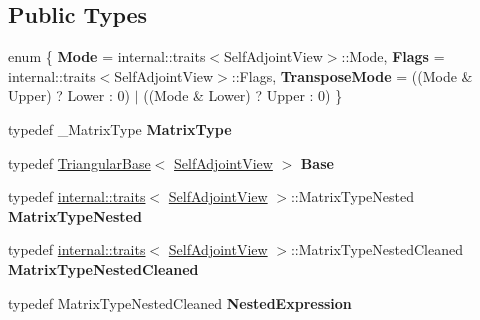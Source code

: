 \subsection*{Public Types}
\begin{DoxyCompactItemize}
\item 
\mbox{\label{class_eigen_1_1_self_adjoint_view_aa62be3bd8c8e4b595691923e883ea725}} 
enum \{ {\bfseries Mode} = internal\+::traits$<$Self\+Adjoint\+View$>$\+::Mode, 
{\bfseries Flags} = internal\+::traits$<$Self\+Adjoint\+View$>$\+::Flags, 
{\bfseries Transpose\+Mode} = ((Mode \& Upper) ? Lower \+: 0) $\vert$ ((Mode \& Lower) ? Upper \+: 0)
 \}
\item 
\mbox{\label{class_eigen_1_1_self_adjoint_view_a9ec5b4c046771bcfbfdf751f3356095b}} 
typedef \+\_\+\+Matrix\+Type {\bfseries Matrix\+Type}
\item 
\mbox{\label{class_eigen_1_1_self_adjoint_view_a2c091fa183af81f0d5d45082ad724dfd}} 
typedef \mbox{\hyperlink{class_eigen_1_1_triangular_base}{Triangular\+Base}}$<$ \mbox{\hyperlink{class_eigen_1_1_self_adjoint_view}{Self\+Adjoint\+View}} $>$ {\bfseries Base}
\item 
\mbox{\label{class_eigen_1_1_self_adjoint_view_a80c089aea071ac21f4e4a1347cd18b6d}} 
typedef \mbox{\hyperlink{struct_eigen_1_1internal_1_1traits}{internal\+::traits}}$<$ \mbox{\hyperlink{class_eigen_1_1_self_adjoint_view}{Self\+Adjoint\+View}} $>$\+::Matrix\+Type\+Nested {\bfseries Matrix\+Type\+Nested}
\item 
\mbox{\label{class_eigen_1_1_self_adjoint_view_a4bf6749960d2e447b4117b4c81f16fff}} 
typedef \mbox{\hyperlink{struct_eigen_1_1internal_1_1traits}{internal\+::traits}}$<$ \mbox{\hyperlink{class_eigen_1_1_self_adjoint_view}{Self\+Adjoint\+View}} $>$\+::Matrix\+Type\+Nested\+Cleaned {\bfseries Matrix\+Type\+Nested\+Cleaned}
\item 
\mbox{\label{class_eigen_1_1_self_adjoint_view_aa1a7d8e02948fef953e9703500b2d97f}} 
typedef Matrix\+Type\+Nested\+Cleaned {\bfseries Nested\+Expression}
\item 
\mbox{\label{class_eigen_1_1_self_adjoint_view_af52acc0942ece2de9b6db4a99cc6656e}} 

\end{DoxyCompactItemize}
